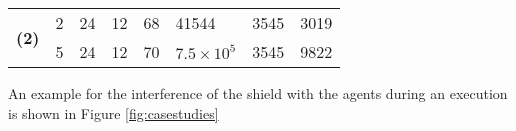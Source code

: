 \begin{table}[]
\begin{tabular}{c|lllllll}
\multirow{2}{*}{\textbf{(2)}}                                             & 2   & 24                                                           & 12                                                            & 68                                                                & 41544                                                 & 3545 & 3019                                                          \\
                                                                          & 5   & 24                                                           & 12                                                            & 70                                                                & $7.5\times 10^5$                                     & 3545 & 9822                                                          \\
                                                                          \bottomrule
\end{tabular}

\end{table}
 An example for the interference of the shield with the agents during an execution is shown in Figure \ref{fig:casestudies}
